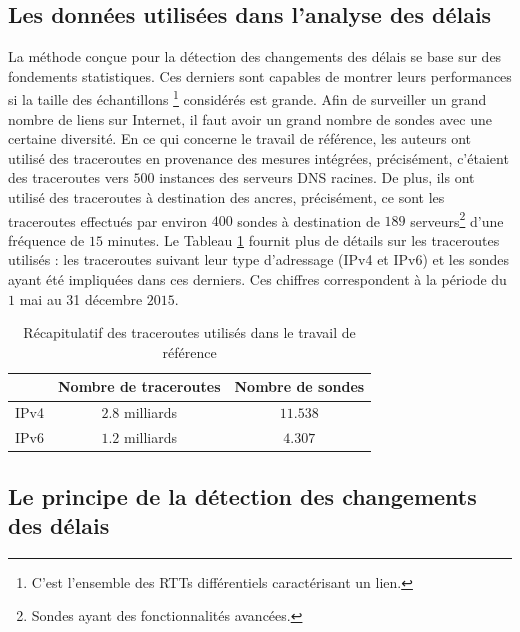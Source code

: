 \subsection{Les données utilisées dans l'analyse des délais}
La méthode conçue pour la détection des changements des délais se base sur des fondements statistiques. Ces derniers sont capables de montrer leurs performances si la taille des échantillons \footnote{C'est l'ensemble des RTTs différentiels caractérisant un lien.} considérés est grande.   Afin de surveiller un grand nombre de liens sur Internet, il faut avoir un grand nombre de sondes avec une certaine diversité.  En ce qui concerne le travail de référence, les auteurs ont utilisé des traceroutes en provenance des mesures intégrées, précisément, c'étaient des traceroutes vers $ 500 $ instances des serveurs DNS racines.
De plus, ils ont utilisé  des traceroutes à destination des ancres, précisément, ce sont les traceroutes effectués par environ $400$ sondes  à destination de $189$ serveurs\footnote{Sondes  ayant des fonctionnalités avancées.}  d'une fréquence de $15$ minutes.
Le Tableau \ref{tab:dataset} fournit plus de détails sur les traceroutes utilisés : les traceroutes suivant leur type d'adressage (IPv4 et IPv6) et les sondes ayant été impliquées dans ces derniers.
Ces chiffres correspondent à la période du $1$ mai au 31 décembre $2015$.
\begin{table}[H]
	\centering
	\begin{tabular}{c c c}
		\hline
		& \textbf{Nombre de traceroutes}& \textbf{Nombre de sondes}\\ \hline
		IPv4		&$ 2.8 $ milliards & $ 11.538 $\\ \hline
		IPv6	&	$ 1.2 $ milliards & $ 4.307 $ \\ \hline
	\end{tabular}
	\caption{Récapitulatif des traceroutes utilisés dans le travail de référence }
	\label{tab:dataset}
\end{table}
\subsection{Le principe de la détection des changements des délais} \label{principe-de-detection}

